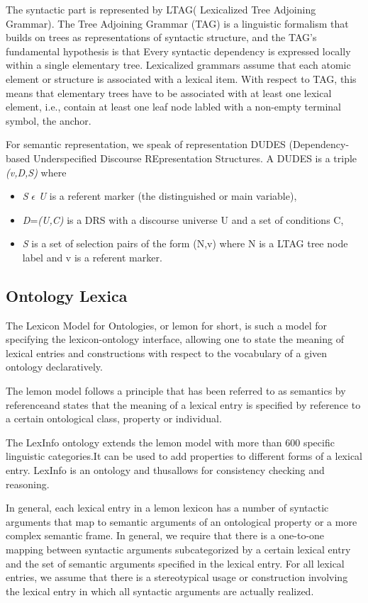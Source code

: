 The syntactic part is represented by LTAG( Lexicalized Tree Adjoining Grammar).  
The Tree Adjoining Grammar (TAG) is a linguistic formalism that builds on trees as representations of syntactic structure, and the TAG's fundamental hypothesis is that Every syntactic dependency is expressed locally within a single elementary tree. Lexicalized grammars assume that each atomic element or structure is associated with a lexical item. With respect to TAG, this means that elementary trees have to be associated with at least one lexical element, i.e., contain at least one leaf node labled with a non-empty terminal symbol, the anchor.

For semantic representation, we speak of representation DUDES (Dependency-based Underspecified Discourse REpresentation Structures.
A DUDES is a triple  \textit{(v,D,S)} where 
\begin{itemize} 
  \item  \textit{S} \begin{math}\epsilon \end{math} \textit{U} is a referent marker (the distinguished or main variable),
  \item \textit{D}=\textit{(U,C)} is a DRS with a discourse universe U and a set of conditions C, 
  \item  \textit{S} is a set of selection pairs of the form (N,v) where N is a LTAG tree node label and v is
a referent marker.
\end{itemize} 

\subsection{Ontology Lexica}
The Lexicon Model for Ontologies, or lemon for short, is such a model for specifying the lexicon-ontology interface, allowing one to state the meaning of lexical entries and constructions with respect to the vocabulary of a given ontology declaratively.

The lemon model follows a principle that has been referred to as semantics by referenceand states that the meaning of a lexical entry is specified by reference to a certain ontological class, property or individual.

The LexInfo ontology extends the lemon model with more than 600 specific linguistic categories.It can be used to add properties to different forms of a lexical entry. LexInfo is an ontology and thusallows for consistency checking and reasoning. 

In general, each lexical entry in a lemon lexicon has a number of syntactic arguments that map to semantic arguments of an ontological property or a more complex semantic frame. In general, we require that there is a one-to-one mapping between syntactic arguments subcategorized by a certain lexical entry and the set of semantic arguments specified in the lexical entry. For all lexical entries, we assume that there is a stereotypical usage or construction involving the lexical entry in which all syntactic arguments are actually realized.
